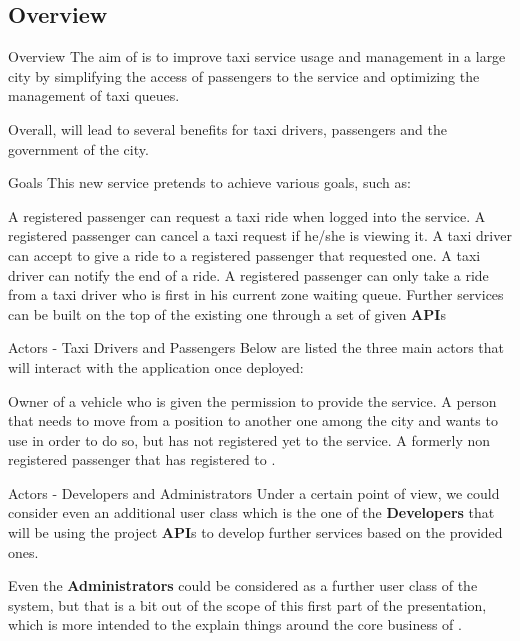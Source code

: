 \documentclass{../common/latex_classes/pdf_presentation}
\begin{document}
	\subsection{Overview}
	\begin{frame}{Overview}
		The aim of \myTaxiService{} is to improve taxi service usage and management in a large city by simplifying the access of passengers to the service and optimizing the management of taxi queues.\par
		Overall, \myTaxiService{} will lead to several benefits for taxi drivers, passengers and the government of the city.
	\end{frame}
	\begin{frame}{Goals}
		This new service pretends to achieve various goals, such as:
		\begin{itemize}
			 A registered passenger can request a taxi ride when logged into the service.
			 A registered passenger can cancel a taxi request if he/she is viewing it.
			 A taxi driver can accept to give a ride to a registered passenger that requested one.
			 A taxi driver can notify the end of a ride.
			 A registered passenger can only take a ride from a taxi driver who is first in his current zone waiting queue.
			 Further services can be built on the top of the existing one through	a set of given \textbf{API}s
		\end{itemize}
	\end{frame}
	\begin{frame}{Actors - Taxi Drivers and Passengers}
		Below are listed the three main actors that will interact with the application once deployed:
		\begin{itemize}
			 Owner of a vehicle who is given the permission to provide the service.
			 A person that needs to move from a position	to another one among the city and wants to use \myTaxiService{} in order to do so, but has not registered yet to the service.
			 A formerly non registered passenger that has registered to \myTaxiService{}.
		\end{itemize}
	\end{frame}
	\begin{frame}{Actors - Developers and Administrators}
		Under a certain point of view, we could consider even an additional user class which is the one of the \textbf{Developers} that will be using the project \textbf{API}s to develop further services based on the provided ones.\par
		Even the \textbf{Administrators} could be considered as a further user class of the system, but that is a bit out of the scope of this first part of the presentation, which is more intended to the explain things around the core business of \myTaxiService{}.
	\end{frame}
\end{document}

